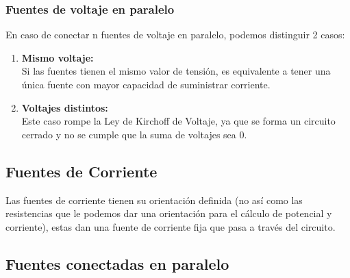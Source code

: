 \subsubsection{Fuentes de voltaje en paralelo}

En caso de conectar n fuentes de voltaje en paralelo, podemos distinguir 2 casos:

    \begin{enumerate}
        \item {\textbf{Mismo voltaje:}}\\
       {Si las fuentes tienen el mismo valor de tensión, es equivalente a tener una única fuente con mayor capacidad de suministrar corriente.}\\
   
    \item {\textbf{Voltajes distintos:}}\\
    {Este caso rompe la Ley de Kirchoff de Voltaje, ya que se forma un circuito cerrado y no se cumple que la suma de voltajes sea 0.}
    \end{enumerate}
 


\subsection{Fuentes de Corriente}

   
Las fuentes de corriente tienen su orientación definida (no así como las resistencias que le podemos dar una orientación para el cálculo de potencial y corriente), estas dan una fuente de corriente fija que pasa a través del circuito.\\




\subsection{Fuentes conectadas en paralelo}

